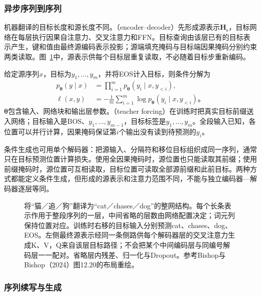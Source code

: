 \subsubsection{异步序列到序列}

机器翻译的目标长度和源长度不同。（encoder--decoder）先形成源表示$\bm H_{\mathrm s}$，目标网络在每层执行因果自注意力、交叉注意力和FFN。目标查询由该层已有的目标表示产生，键和值由最终源编码表示投影；源端填充掩码与目标端因果掩码分别约束两类读取。图~\ref{fig:transformer-encoder-decoder}中，源表示供每个目标层重复读取，不必随着目标步重新编码。

给定源序列$x$，目标为$y_1,\ldots,y_m$，并将EOS计入目标，则条件分解为
\begin{equation}
  \begin{aligned}
    p_{\bm\theta}(y\mid x)
      &=\prod_{i=1}^{m}p_{\bm\theta}(y_i\mid x,y_{<i}),\\
    \ell(x,y)&=-\frac1m\sum_{i=1}^{m}
          \log p_{\bm\theta}(y_i\mid x,y_{<i})\text{。}
  \end{aligned}
  \label{eq:transformer-conditional-loss}
\end{equation}
$\bm\theta$包含输入、网络块和输出层参数。（teacher forcing）在训练时把真实目标前缀送入网络；目标输入是BOS、$y_1,\ldots,y_{m-1}$，目标标签是$y_1,\ldots,y_m$。全段输入已知，各位置可以并行计算，因果掩码保证第$i$个输出没有读到待预测的$y_i$。

条件生成也可用单个解码器：把源输入、分隔符和移位目标组织成同一序列，通常只在目标预测位置计算损失。使用全因果掩码时，源位置也只能读取其前缀；使用前缀掩码时，源位置可互相读取，目标位置可读取全部源前缀和此前目标。两种方式都能定义条件生成，但形成的源表示和注意力范围不同，不能与独立编码器—解码器逐层等同。

\begin{figure}[htbp]
  \centering
  
  \caption{将“猫／追／狗”翻译为“cat／chases／dog”的整网结构。每个长条表示作用于整段序列的一层，中间省略的层数由网络配置决定；词元列保持位置对应。训练时右移的目标输入分别预测cat、chases、dog、EOS。左侧最终源表示经同一条侧路供每个解码器层的交叉注意力生成K、V，Q来自该层目标路径；不会把某个中间编码层与同编号解码层一一配对。省略层内残差、归一化与Dropout。参考Bishop与Bishop（2024）图12.20的布局重绘。}
  \label{fig:transformer-encoder-decoder}
\end{figure}
\FloatBarrier

\subsubsection{序列续写与生成}

